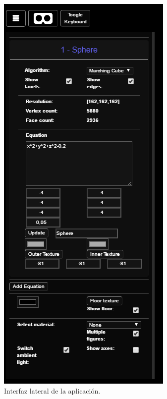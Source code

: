 \documentclass[12pt]{article}
\begin{document}
\begin{figure}
\includegraphics[width=0.9\linewidth]{interfaz_lateral.png} 
\caption{Interfaz lateral de la aplicación.}
\label{fig:subim1}
\end{figure}
\end{document}
